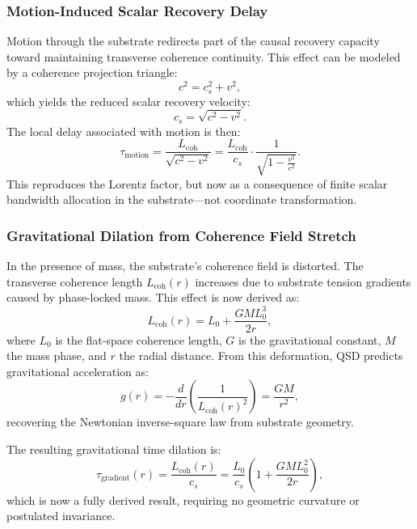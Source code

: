 \documentclass[entropy,article,submit,pdftex,moreauthors]{Definitions/mdpi}
\begin{document}
\subsubsection{Motion-Induced Scalar Recovery Delay}

Motion through the substrate redirects part of the causal recovery capacity toward maintaining transverse coherence continuity. This effect can be modeled by a coherence projection triangle:
\begin{equation}
c^2 = c_s^2 + v^2,
\end{equation}
which yields the reduced scalar recovery velocity:
\begin{equation}
c_s = \sqrt{c^2 - v^2}.
\end{equation}
The local delay associated with motion is then:
\begin{equation}
\tau_{\text{motion}} = \frac{L_{\text{coh}}}{\sqrt{c^2 - v^2}} = \frac{L_{\text{coh}}}{c_s} \cdot \frac{1}{\sqrt{1 - \frac{v^2}{c^2}}}.
\end{equation}
This reproduces the Lorentz factor, but now as a consequence of finite scalar bandwidth allocation in the substrate—not coordinate transformation.

\subsubsection{Gravitational Dilation from Coherence Field Stretch}

In the presence of mass, the substrate’s coherence field is distorted. The transverse coherence length \( L_{\text{coh}}(r) \) increases due to substrate tension gradients caused by phase-locked mass. This effect is now derived as:
\begin{equation}
L_{\text{coh}}(r) = L_0 + \frac{GM L_0^3}{2r},
\end{equation}
where \( L_0 \) is the flat-space coherence length, \( G \) is the gravitational constant, \( M \) the mass phase, and \( r \) the radial distance. From this deformation, QSD predicts gravitational acceleration as:
\begin{equation}
g(r) = -\frac{d}{dr}\left(\frac{1}{L_{\text{coh}}(r)^2}\right) = \frac{GM}{r^2},
\end{equation}
recovering the Newtonian inverse-square law from substrate geometry.

The resulting gravitational time dilation is:
\begin{equation}
\tau_{\text{gradient}}(r) = \frac{L_{\text{coh}}(r)}{c_s} = \frac{L_0}{c_s} \left(1 + \frac{GM L_0^2}{2r}\right),
\end{equation}
which is now a fully derived result, requiring no geometric curvature or postulated invariance.
\end{document}
